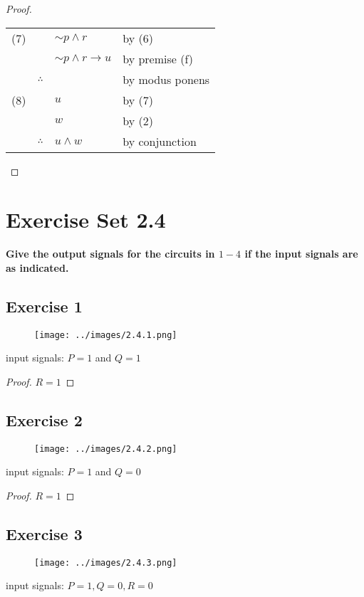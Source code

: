 \documentclass[14pt]{extarticle}
\begin{document}
\begin{proof}
\begin{tabular}{rrll}
        (7) &              & ${\sim p} \wedge r$       & by (6)           \\
            &              & ${\sim p} \wedge r \to u$ & by premise (f)   \\
            & $\therefore$ & $ $                       & by modus ponens  \\
        (8) &              & $u$                       & by (7)           \\
            &              & $w$                       & by (2)           \\
            & $\therefore$ & $u \wedge w$              & by conjunction   \\
    \end{tabular}
\end{proof}

\section{Exercise Set 2.4}
 {\bf \color{cyan} Give the output signals for the circuits in $1-4$ if the input signals are as indicated.}

\subsection{Exercise 1}
\begin{figure}[ht!]
    \centering
    \texttt{[image: ../images/2.4.1.png]}
\end{figure}
input signals: $P = 1$ and $Q = 1$

\begin{proof}
    $R = 1$
\end{proof}

\subsection{Exercise 2}
\begin{figure}[ht!]
    \centering
    \texttt{[image: ../images/2.4.2.png]}
\end{figure}
input signals: $P = 1$ and $Q = 0$

\begin{proof}
    $R = 1$
\end{proof}

\subsection{Exercise 3}
\begin{figure}[ht!]
    \centering
    \texttt{[image: ../images/2.4.3.png]}
\end{figure}
input signals: $P = 1, Q = 0, R = 0$
\end{document}
